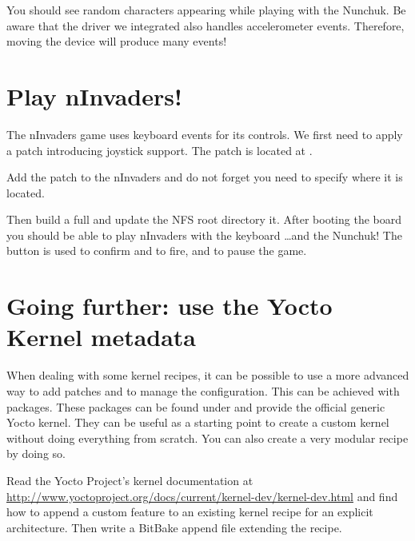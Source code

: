 You should see random characters appearing while playing with the Nunchuk. Be
aware that the driver we integrated also handles accelerometer events. Therefore,
moving the device will produce many events!

\section{Play nInvaders!}

The nInvaders game uses keyboard events for its controls. We first need to apply
a patch introducing joystick support. The patch is located at
.

Add the patch to the nInvaders  and do not forget you need to
specify where it is located.

Then build a full  and update the NFS root directory
it. After booting the board you should be able to play nInvaders with the
keyboard \dots and the Nunchuk! The  button is used to confirm and to
fire, and  to pause the game.

\section{Going further: use the Yocto Kernel metadata}

When dealing with some kernel recipes, it can be possible to use a more advanced
way to add patches and to manage the configuration. This can be achieved with
 packages. These packages can be found under
 and provide the official generic Yocto kernel.
They can be useful as a starting point to create a custom kernel without doing
everything from scratch. You can also create a very modular recipe by doing so.

Read the Yocto Project's kernel documentation at
\url{http://www.yoctoproject.org/docs/current/kernel-dev/kernel-dev.html} and
find how to append a custom feature to an existing kernel recipe for an
explicit architecture. Then write a BitBake append file extending the
 recipe.
